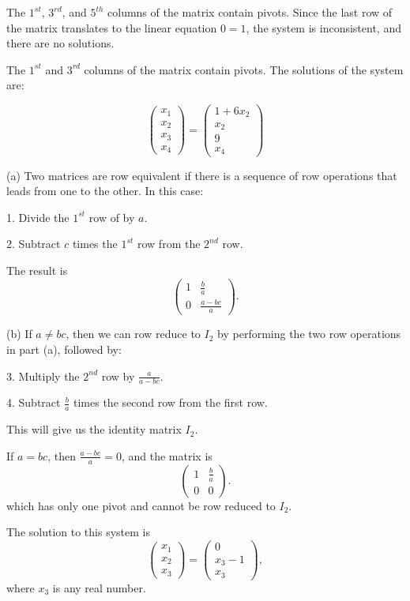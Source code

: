  The $1^{st}$, $3^{rd}$, and $5^{th}$ columns of the matrix
contain pivots.  Since the last row of the matrix translates to the linear
equation $0 = 1$, the system is inconsistent, and there are no solutions.

 The $1^{st}$ and $3^{rd}$ columns of the matrix contain
pivots.  The solutions of the system are:

\[
\left(\begin{array}{r} x_1 \\ x_2 \\ x_3\\ x_4\end{array} \right)
= \left(\begin{array}{c} 1 + 6x_2 \\ x_2 \\ 9 \\ x_4\end{array} \right)
\]

(a)
Two matrices are row equivalent if there is a sequence of row operations
that leads from one to the other.  In this case:

1. Divide the $1^{st}$ row of  by $a$.

2. Subtract $c$ times the $1^{st}$ row from the $2^{nd}$ row.

The result is
\[
\left(\begin{array}{cc} 1 & \frac{b}{a} \\ 0 & \frac{a - bc}{a}\end{array}
\right).
\]

(b) If $a \neq bc$, then we can row reduce  to $I_2$ by
performing the two row operations in part (a), followed by:

3. Multiply the $2^{nd}$ row by $\frac{a}{a - bc}$.

4. Subtract $\frac{b}{a}$ times the second row from the first row.

This will give us the identity matrix $I_2$.

\para If $a = bc$, then $\frac{a - bc}{a} = 0$, and the matrix is
\[
\left(\begin{array}{cc} 1 & \frac{b}{a} \\ 0 & 0\end{array} \right).
\]
which has only one pivot and cannot be row reduced to $I_2$.

\ans The solution to this system is
\[
\left(\begin{array}{c} x_1 \\ x_2 \\ x_3\end{array}\right) =
\left(\begin{array}{c} 0 \\ x_3 - 1 \\ x_3\end{array}\right),
\]
where $x_3$ is any real number.

